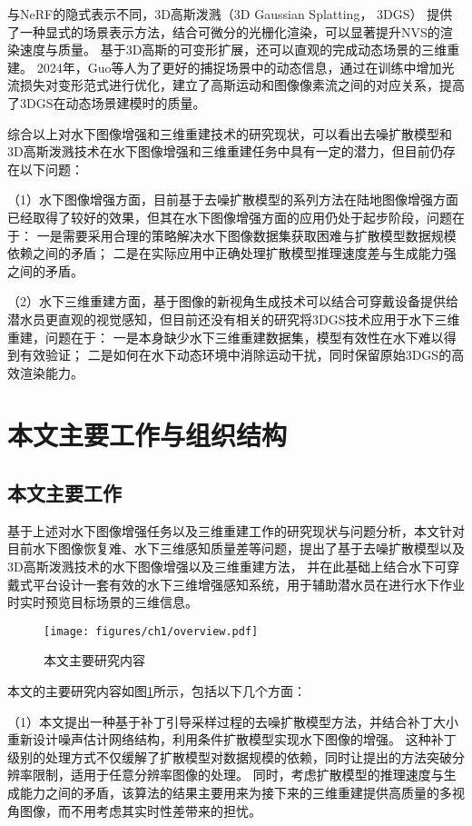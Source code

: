 与NeRF的隐式表示不同，3D高斯泼溅（3D Gaussian Splatting， 3DGS） \cite{3DGS} 提供了一种显式的场景表示方法，结合可微分的光栅化渲染，可以显著提升NVS的渲染速度与质量。
基于3D高斯的可变形扩展\cite{dynamic_3DGS1}\cite{dynamic_3DGS2}\cite{dynamic_3DGS_efficient}\cite{4DGS}，还可以直观的完成动态场景的三维重建。
2024年，Guo等人\cite{flow_2024motion}为了更好的捕捉场景中的动态信息，通过在训练中增加光流损失对变形范式进行优化，建立了高斯运动和图像像素流之间的对应关系，提高了3DGS在动态场景建模时的质量。

综合以上对水下图像增强和三维重建技术的研究现状，可以看出去噪扩散模型和3D高斯泼溅技术在水下图像增强和三维重建任务中具有一定的潜力，但目前仍存在以下问题：

（1）水下图像增强方面，目前基于去噪扩散模型的系列方法在陆地图像增强方面已经取得了较好的效果，但其在水下图像增强方面的应用仍处于起步阶段，问题在于：
一是需要采用合理的策略解决水下图像数据集获取困难与扩散模型数据规模依赖之间的矛盾；
二是在实际应用中正确处理扩散模型推理速度差与生成能力强之间的矛盾。

（2）水下三维重建方面，基于图像的新视角生成技术可以结合可穿戴设备提供给潜水员更直观的视觉感知，但目前还没有相关的研究将3DGS技术应用于水下三维重建，问题在于：
一是本身缺少水下三维重建数据集，模型有效性在水下难以得到有效验证；
二是如何在水下动态环境中消除运动干扰，同时保留原始3DGS的高效渲染能力。


\section{本文主要工作与组织结构}
\subsection{本文主要工作}
基于上述对水下图像增强任务以及三维重建工作的研究现状与问题分析，本文针对目前水下图像恢复难、水下三维感知质量差等问题，提出了基于去噪扩散模型以及3D高斯泼溅技术的水下图像增强以及三维重建方法\cite{patch_based_ddpm}，
并在此基础上结合水下可穿戴式平台设计一套有效的水下三维增强感知系统，用于辅助潜水员在进行水下作业时实时预览目标场景的三维信息。
\begin{figure}
    \centering
    \texttt{[image: figures/ch1/overview.pdf]}
    \caption{本文主要研究内容}
    \label{img:overview}
\end{figure}

本文的主要研究内容如图\ref{img:overview}所示，包括以下几个方面：

（1）本文提出一种基于补丁引导采样过程的去噪扩散模型方法，并结合补丁大小重新设计噪声估计网络结构，利用条件扩散模型实现水下图像的增强。
这种补丁级别的处理方式不仅缓解了扩散模型对数据规模的依赖，同时让提出的方法突破分辨率限制，适用于任意分辨率图像的处理。
同时，考虑扩散模型的推理速度与生成能力之间的矛盾，该算法的结果主要用来为接下来的三维重建提供高质量的多视角图像，而不用考虑其实时性差带来的担忧。\cite{patch_based_ddpm}

